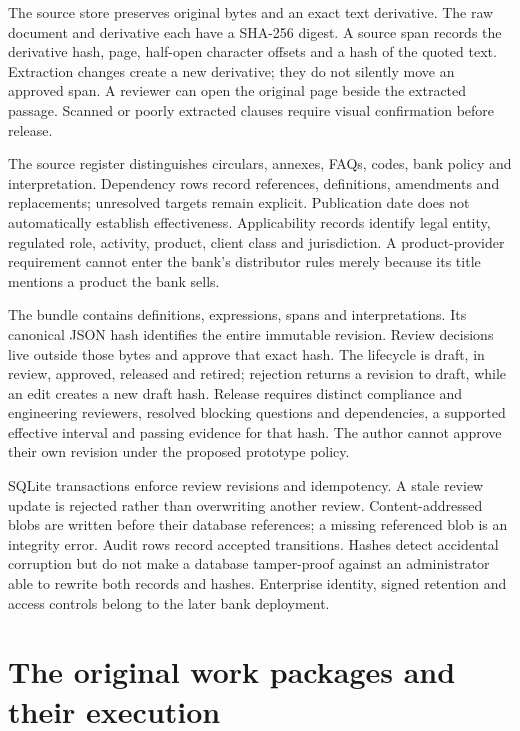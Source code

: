The source store preserves original bytes and an exact text derivative. The raw
document and derivative each have a SHA-256 digest. A source span records the
derivative hash, page, half-open character offsets and a hash of the quoted text.
Extraction changes create a new derivative; they do not silently move an approved
span. A reviewer can open the original page beside the extracted passage.
Scanned or poorly extracted clauses require visual confirmation before release.

The source register distinguishes circulars, annexes, FAQs, codes, bank policy
and interpretation. Dependency rows record references, definitions, amendments
and replacements; unresolved targets remain explicit. Publication date does not
automatically establish effectiveness. Applicability records identify legal
entity, regulated role, activity, product, client class and jurisdiction. A
product-provider requirement cannot enter the bank's distributor rules merely
because its title mentions a product the bank sells.


The bundle contains definitions, expressions, spans and interpretations. Its
canonical JSON hash identifies the entire immutable revision. Review decisions
live outside those bytes and approve that exact hash. The lifecycle is draft,
in review, approved, released and retired; rejection returns a revision to draft,
while an edit creates a new draft hash. Release requires distinct compliance and
engineering reviewers, resolved blocking questions and dependencies, a supported
effective interval and passing evidence for that hash. The author cannot approve
their own revision under the proposed prototype policy.

SQLite transactions enforce review revisions and idempotency. A stale review
update is rejected rather than overwriting another review. Content-addressed
blobs are written before their database references; a missing referenced blob
is an integrity error. Audit rows record accepted transitions. Hashes detect
accidental corruption but do not make a database tamper-proof against an
administrator able to rewrite both records and hashes. Enterprise identity,
signed retention and access controls belong to the later bank deployment.

\section{The original work packages and their execution}

